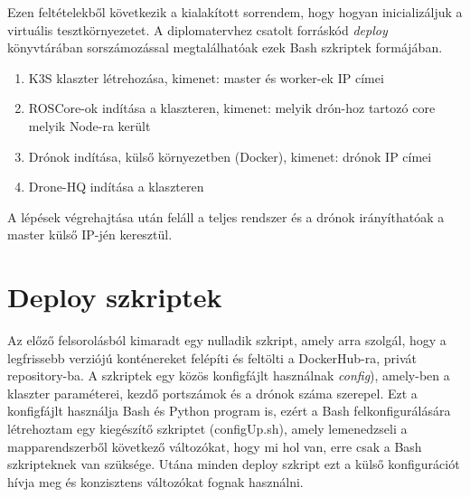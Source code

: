 \noindent
Ezen feltételekből következik a kialakított sorrendem, hogy hogyan inicializáljuk a virtuális tesztkörnyezetet. A diplomatervhez csatolt forráskód \emph{deploy} könyvtárában sorszámozással megtalálhatóak ezek Bash szkriptek formájában.

\begin{enumerate}
	\item K3S klaszter létrehozása, kimenet: master és worker-ek IP címei
	\item ROSCore-ok indítása a klaszteren, kimenet: melyik drón-hoz tartozó core melyik Node-ra került
	\item Drónok indítása, külső környezetben (Docker), kimenet: drónok IP címei
	\item Drone-HQ indítása a klaszteren
\end{enumerate}
A lépések végrehajtása után feláll a teljes rendszer és a drónok irányíthatóak a master külső IP-jén keresztül.

\section{Deploy szkriptek}
Az előző felsorolásból kimaradt egy nulladik szkript, amely arra szolgál, hogy a legfrissebb verziójú konténereket felépíti és feltölti a DockerHub-ra, privát repository-ba. A szkriptek egy közös konfigfájlt használnak \emph{config}), amely-ben a klaszter paraméterei, kezdő portszámok és a drónok száma szerepel. Ezt a konfigfájlt használja Bash és Python program is, ezért a Bash felkonfigurálására létrehoztam egy kiegészítő szkriptet (configUp.sh), amely lemenedzseli a mapparendszerből következő változókat, hogy mi hol van, erre csak a Bash szkripteknek van szüksége. Utána minden deploy szkript ezt a külső konfigurációt hívja meg és konzisztens változókat fognak használni. \\

